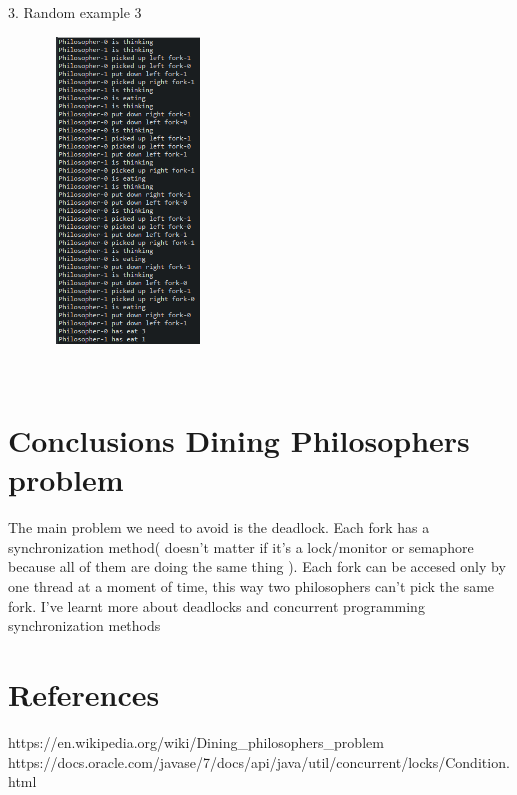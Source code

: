 \documentclass[14pt]{article}
\begin{document}
\begin{center}
3. Random example 3\\
\vspace{10mm}

\includegraphics[height=3.2in, width = 2.5in]{philolock3.png}\\
\end{center}\\


\section*{Conclusions Dining Philosophers problem}
\vspace{10 mm}
The main problem we need to avoid is the deadlock. Each fork has a synchronization method( doesn't matter if it's a lock/monitor or semaphore because all of them are doing the same thing ). Each fork can be accesed only by one thread at a moment of time, this way two philosophers can't pick the same fork. I've learnt more about deadlocks and concurrent programming synchronization methods

\newpage
\section*{References}
https://en.wikipedia.org/wiki/Dining_philosophers_problem
\\
https://docs.oracle.com/javase/7/docs/api/java/util/concurrent/locks/Condition.html
\\
\end{document}
